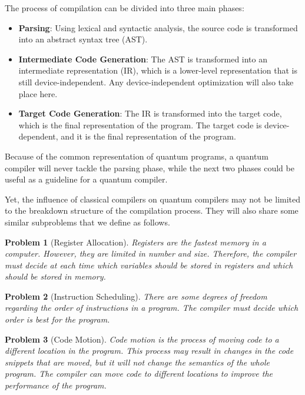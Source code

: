 \documentclass{report}
\newtheorem{problem}{Problem}
\begin{document}
The process of compilation can be divided into three main phases:

\begin{itemize}
  \item \textbf{Parsing}: Using lexical and syntactic analysis, the source code is transformed into an abstract syntax tree (AST).

  \item \textbf{Intermediate Code Generation}: The AST is transformed into an intermediate representation (IR), which is a lower-level representation that is still device-independent. Any device-independent optimization will also take place here.

  \item \textbf{Target Code Generation}: The IR is transformed into the target code, which is the final representation of the program. The target code is device-dependent, and it is the final representation of the program.
\end{itemize}

Because of the common representation of quantum programs, a quantum compiler will never tackle the parsing phase, while the next two phases could be useful as a guideline for a quantum compiler.

Yet, the influence of classical compilers on quantum compilers may not be limited to the breakdown structure of the compilation process. They will also share some similar subproblems that we define as follows.

\begin{problem}[Register Allocation]
  \label{ref:register_allocation}
  Registers are the fastest memory in a computer. However, they are limited in number and size. Therefore, the compiler must decide at each time which variables should be stored in registers and which should be stored in memory.~\cite[pp. 440-444]{allen2001}
\end{problem}

\begin{problem}[Instruction Scheduling]
  There are some degrees of freedom regarding the order of instructions in a program. The compiler must decide which order is best for the program.~\cite[chap. 10]{allen2001}
\end{problem}

\begin{problem}[Code Motion]
  Code motion is the process of moving code to a different location in the program. This process may result in changes in the code snippets that are moved, but it will not change the semantics of the whole program. The compiler can move code to different locations to improve the performance of the program.~\cite[p. 592]{aho1986}
\end{problem}
\end{document}
